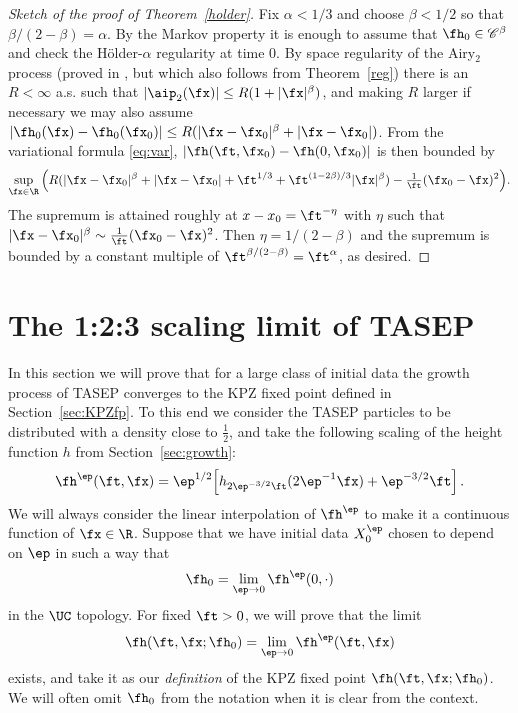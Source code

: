 \documentclass[]{pcmi}
\theoremstyle{plain}
\theoremstyle{definition}
\begin{document}
\begin{proof}[Sketch of the proof of Theorem~\ref{holder}]
Fix $\alpha<1/3$ and choose $\beta<1/2$ so that $\beta/(2-\beta)=\alpha$.
By the Markov property it is enough to assume that $\fh_0\in \mathscr C^\beta$ and check the H\"older-$\alpha$ regularity at time 0.
By space regularity of the Airy$_2$ process (proved in \cite{quastelRemAiry1}, but which also follows from Theorem~\ref{reg}) there is an $R<\infty$ a.s. such that $|\aip_2(\fx)|\le R(1+ |\fx|^{\beta})$, and making $R$ larger if necessary we may also assume $| \fh_0(\fx)- \fh_0( \fx_0)| \le R( |\fx-\fx_0|^{\beta} + |\fx-\fx_0|)$.
From the variational formula \eqref{eq:var}, $|\fh(\ft, \fx_0) - \fh(0,\fx_0)|$ is then bounded by
\begin{equation*}
\sup_{\fx\in\R}\Big(R  ( |\fx-\fx_0|^{\beta} + |\fx-\fx_0| + \ft^{1/3} +  \ft^{(1 - 2\beta)/3 }|\fx|^\beta)  - \tfrac1\ft (\fx_0-\fx)^2\Big).
\end{equation*}
The supremum is attained roughly at $x-x_0=\ft^{-\eta}$ with $\eta$ such that $|\fx-\fx_0|^{\beta}\sim\tfrac1\ft (\fx_0-\fx)^2$.
Then $\eta=1/(2-\beta)$ and the supremum is bounded by a constant multiple of $\ft^{\beta/(2-\beta)}=\ft^\alpha$, as desired.
\end{proof}

\section{The 1:2:3 scaling limit of TASEP}
\label{sec:TASEPlimit}

In this section we will prove that for a large class of initial data the growth process of TASEP converges to the KPZ fixed point defined in Section~\ref{sec:KPZfp}. To this end we consider the TASEP particles to be distributed with a density close to $\frac{1}{2}$, and take the following scaling of the height function $h$ from Section~\ref{sec:growth}:
\begin{equation}\label{eq:hep}
	\fh^{\ep}(\ft,\fx) = \ep^{1/2}\!\left[h_{2\ep^{-3/2}\ft}(2\ep^{-1}\fx) + \ep^{-3/2}\ft\right].
\end{equation}
We will always consider the linear interpolation of $\fh^{\ep}$ to make it a continuous function of $\fx\in \R$. Suppose that we have initial data  $X_0^\ep$ chosen to depend on $\ep$ in such a way that
\begin{equation}\label{xplim}
\fh_0=\lim_{\ep\to 0} \fh^{\ep}(0,\cdot)
\end{equation}
in the $\UC$ topology. For fixed $\ft>0$, we will prove that the limit 
\begin{equation}\label{eq:height-cvgce}
\fh(\ft,\fx;\fh_0)=\lim_{\ep\to0}\fh^{\ep}(\ft,\fx)
\end{equation}
exists, and take it as our \emph{definition} of the KPZ fixed point $\fh(\ft,\fx; \fh_0)$. We will often omit $\fh_0$ from the notation when it is clear from the context.
\end{document}
